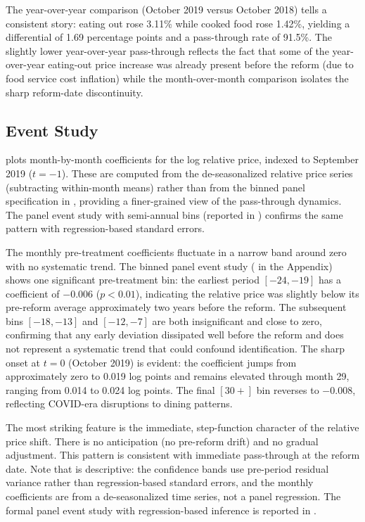 \documentclass[12pt]{article}
\begin{document}
The year-over-year comparison (October 2019 versus October 2018) tells a consistent story: eating out rose 3.11\% while cooked food rose 1.42\%, yielding a differential of 1.69 percentage points and a pass-through rate of 91.5\%. The slightly lower year-over-year pass-through reflects the fact that some of the year-over-year eating-out price increase was already present before the reform (due to food service cost inflation) while the month-over-month comparison isolates the sharp reform-date discontinuity.



\subsection{Event Study}

 plots month-by-month coefficients for the log relative price, indexed to September 2019 ($t = -1$). These are computed from the de-seasonalized relative price series (subtracting within-month means) rather than from the binned panel specification in , providing a finer-grained view of the pass-through dynamics. The panel event study with semi-annual bins (reported in ) confirms the same pattern with regression-based standard errors.

The monthly pre-treatment coefficients fluctuate in a narrow band around zero with no systematic trend. The binned panel event study ( in the Appendix) shows one significant pre-treatment bin: the earliest period $[-24, -19]$ has a coefficient of $-0.006$ ($p < 0.01$), indicating the relative price was slightly below its pre-reform average approximately two years before the reform. The subsequent bins $[-18, -13]$ and $[-12, -7]$ are both insignificant and close to zero, confirming that any early deviation dissipated well before the reform and does not represent a systematic trend that could confound identification. The sharp onset at $t = 0$ (October 2019) is evident: the coefficient jumps from approximately zero to 0.019 log points and remains elevated through month 29, ranging from 0.014 to 0.024 log points. The final $[30+]$ bin reverses to $-0.008$, reflecting COVID-era disruptions to dining patterns.

The most striking feature is the immediate, step-function character of the relative price shift. There is no anticipation (no pre-reform drift) and no gradual adjustment. This pattern is consistent with immediate pass-through at the reform date. Note that  is descriptive: the confidence bands use pre-period residual variance rather than regression-based standard errors, and the monthly coefficients are from a de-seasonalized time series, not a panel regression. The formal panel event study with regression-based inference is reported in .
\end{document}
